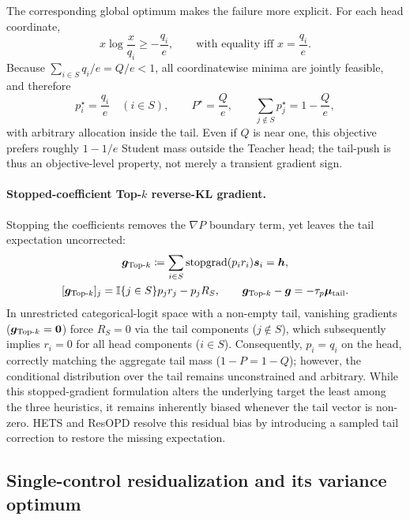 The corresponding global optimum makes the failure more explicit. For each
head coordinate,
\begin{equation}
 x\log\frac{x}{q_i}\geq-\frac{q_i}{e},
 \qquad\text{with equality iff }x=\frac{q_i}{e}.
\end{equation}
Because $\sum_{i\in S}q_i/e=Q/e<1$, all coordinatewise minima are jointly
feasible, and therefore
\begin{equation}
 p_i^\star=\frac{q_i}{e}\quad(i\in S),\qquad
 P^\star=\frac{Q}{e},\qquad
 \sum_{j\notin S}p_j^\star=1-\frac{Q}{e},
 \label{eq:scalar-truncated-optimum}
\end{equation}
with arbitrary allocation inside the tail. Even if $Q$ is near one, this
objective prefers roughly $1-1/e$ Student mass outside the Teacher head; the
tail-push is thus an objective-level property, not merely a transient gradient
sign.

\paragraph{Stopped-coefficient Top-$k$ reverse-KL gradient.}
Stopping the coefficients removes the $\nabla P$ boundary term, yet leaves the tail expectation uncorrected:
\begin{equation}
  \begin{gathered}
    \bgrad_{\text{Top-}k} \coloneqq \sum_{i \in S} \operatorname{stopgrad}(p_i r_i) \bscore_i = \bhead, \\
    [\bgrad_{\text{Top-}k}]_j = \ind\{j \in S\} p_j r_j - p_j R_S, \qquad
    \bgrad_{\text{Top-}k} - \bgrad = -\tau_p \bmean_{\mathrm{tail}}.
  \end{gathered}
  \label{eq:stopped-topk-gradient-bias}
\end{equation}
In unrestricted categorical-logit space with a non-empty tail, vanishing gradients ($\bm{g}_{\text{Top-}k} = \mathbf{0}$) force $R_S = 0$ via the tail components ($j \notin S$), which subsequently implies $r_i = 0$ for all head components ($i \in S$). Consequently, $p_i = q_i$ on the head, correctly matching the aggregate tail mass ($1 - P = 1 - Q$); however, the conditional distribution over the tail remains unconstrained and arbitrary. While this stopped-gradient formulation alters the underlying target the least among the three heuristics, it remains inherently biased whenever the tail vector is non-zero. HETS and ResOPD resolve this residual bias by introducing a sampled tail correction to restore the missing expectation.

\subsection{Single-control residualization and its variance optimum}
\label{app:single-control}

